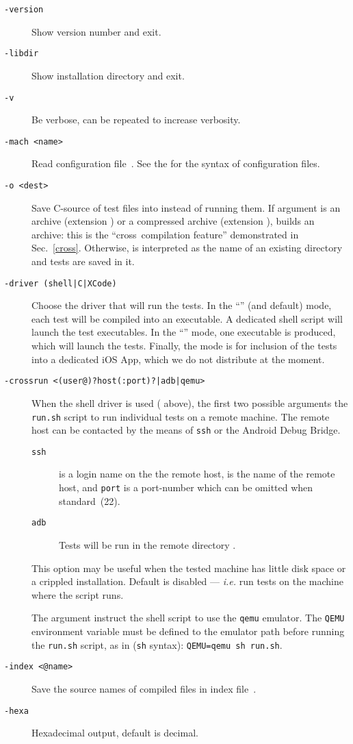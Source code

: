 \begin{description}
\item[{\tt -version}] Show version number and exit.
\item[{\tt -libdir}] Show installation directory and exit.
\item[{\tt -v}] Be verbose, can be repeated to increase verbosity.
\item[{\tt -mach <name>}] Read configuration file~.
See the 
for the syntax of configuration files.
\item[{\tt -o <dest>}]
Save C-source of test files into  instead of running them.
If  argument  is an archive (extension )
or a compressed archive (extension ),
\litmus{} builds an archive: this is the ``cross~compilation feature''
demonstrated in Sec.~\ref{cross}.
Otherwise,  is interpreted as the name of an
existing directory and tests are saved in it.
\item[{\tt -driver (shell|C|XCode)}]
Choose the driver that will run the tests.
In the ``'' (and default) mode,
each test will be compiled into an executable. A dedicated shell script
 will launch the test executables.
In the ``'' mode, one executable  is produced, which
will launch the tests.
Finally, the  mode is for inclusion of the tests into
a dedicated iOS App, which we do not distribute at the moment.
\item[{\tt -crossrun <(user@)?host(:port)?|adb|qemu>}]
When the shell driver is used ( above),
the first two possible arguments 
the \texttt{run.sh} script to run individual tests on a remote machine.
The remote host can be contacted by the means of \texttt{ssh}
or the Android Debug Bridge.
\begin{description}
\item[\tt ssh]
 is a login name on the the remote host,
 is the name of the remote host,
and \texttt{port} is a port-number which can be omitted when standard~(22).
\item[\tt adb]
Tests will be run in the remote directory .
\end{description}
This option may be useful when the tested machine has little disk space or a
crippled installation.
Default is disabled --- \emph{i.e.} run tests on
the machine where the  script runs.

The argument  instruct the shell script to use the \texttt{qemu}
emulator. The \texttt{QEMU} environment variable must be defined to the
emulator path before running the \texttt{run.sh} script, as in (\texttt{sh} syntax): \verb+QEMU=qemu sh run.sh+.


\item[{\tt -index <@name>}] Save the source names of compiled files in index
file~.
\item[{\tt -hexa}] Hexadecimal output, default is decimal.
\end{description}


